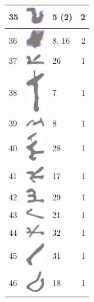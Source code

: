 \documentclass[final]{report}
\begin{document}
\begin{center}
\begin{longtable}{|p{0.5cm}|p{1.2cm}|p{11.89cm}|r|}
\hline
35 & \includegraphics[align=t,width=0.8cm]{0035} & 5 (2) & 2 \\
\hline
36 & \includegraphics[align=t,width=0.8cm]{0036} & 8, 16 & 2 \\
\hline
37 & \includegraphics[align=t,width=0.8cm]{0037} & 26 & 1 \\
\hline
38 & \includegraphics[align=t,width=0.8cm]{0038} & 7 & 1 \\
\hline
39 & \includegraphics[align=t,width=0.8cm]{0039} & 8 & 1 \\
\hline
40 & \includegraphics[align=t,width=0.8cm]{0040} & 28 & 1 \\
\hline
41 & \includegraphics[align=t,width=0.8cm]{0041} & 17 & 1 \\
\hline
42 & \includegraphics[align=t,width=0.8cm]{0042} & 29 & 1 \\
\hline
43 & \includegraphics[align=t,width=0.8cm]{0043} & 21 & 1 \\
\hline
44 & \includegraphics[align=t,width=0.8cm]{0044} & 32 & 1 \\
\hline
45 & \includegraphics[align=t,width=0.8cm]{0045} & 31 & 1 \\
\hline
46 & \includegraphics[align=t,width=0.8cm]{0046} & 18 & 1 \\
\hline
\end{longtable}
\end{center}
\end{document}
